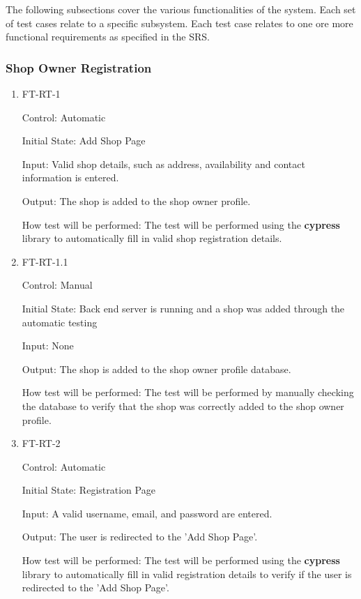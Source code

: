 \documentclass[12pt, titlepage]{article}
\begin{document}
The following subsections cover the various functionalities of the system. Each set of test cases relate to a specific subsystem. Each test case relates to one ore more functional requirements as specified in the SRS.

\subsubsection{Shop Owner Registration}

		

\begin{enumerate}

\item{FT-RT-1\\}

Control: Automatic
					
Initial State: Add Shop Page
					
Input: Valid shop details, such as address, availability and contact information is entered.
					
Output: The shop is added to the shop owner profile.

How test will be performed: The test will be performed using the \textbf{cypress} library to automatically fill in valid shop registration details.

\item{FT-RT-1.1\\}

Control: Manual
					
Initial State: Back end server is running and a shop was added through the automatic testing
					
Input: None
					
Output: The shop is added to the shop owner profile database.

How test will be performed: The test will be performed by manually checking the database to verify that the shop was correctly added to the shop owner profile.


\item{FT-RT-2\\}

Control: Automatic
					
Initial State: Registration Page
					
Input: A valid username, email, and password are entered.
					
Output: The user is redirected to the 'Add Shop Page'.
					
How test will be performed: The test will be performed using the \textbf{cypress} library to automatically fill in valid registration details to verify if the user is redirected to the 'Add Shop Page'.

\end{enumerate}
\end{document}
